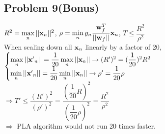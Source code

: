 \documentclass[12pt, a4paper]{article}
\begin{document}
\begin{CJK}{UTF8}{bkai}
	\section*{Problem 9(Bonus)}
		$R^2 = \max\limits_{n} ||{\bf x}_n||^2$, 
		$\rho = \min\limits_{n}y_n  \dfrac{{\bf w}_{f}^{T}}{||{\bf w}_f||}{\bf x}_n$, 
		$T \leq \dfrac{R^2}{\rho^2}$ \\
		When scaling down all ${\bf x}_n$ linearly by a factor of 20, \\
		$\begin{cases}
			\max\limits_{n}||{\bf x'}_n|| = \dfrac{1}{20}\max\limits_{n}||{\bf x}_n ||
			\rightarrow (R')^2 = (\dfrac{1}{20})^2 R^2 \\
			\min\limits_{n}||{\bf x'}_n|| = \dfrac{1}{20}\min\limits_{n}||{\bf x}_n ||
			\rightarrow \rho' =  \dfrac{1}{20} \rho\\
		\end{cases}$ \\
		$\Rightarrow T' \leq \dfrac{(R')^2}{(\rho')^2} = \dfrac{(\dfrac{1}{20}R)^2}{(\dfrac{1}{20}\rho)^2} = \dfrac{R^2}{\rho^2}$ \\
		$\Rightarrow$ PLA algorithm would not run 20 times faster.


	\clearpage
	\end{CJK}
\end{document}

